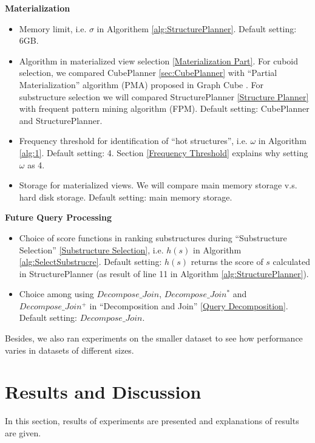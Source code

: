 \textbf{Materialization}
\begin{itemize}
	
	\item  Memory limit, i.e. $\sigma$ in Algorithem \ref{alg:StructurePlanner}. Default setting: 6GB.
	
	\item  Algorithm in materialized view selection \ref{Materialization Part}. For cuboid selection, we  compared CubePlanner \ref{sec:CubePlanner} with ``Partial Materialization'' algorithm (PMA) proposed in Graph Cube \cite{DBLP:conf/sigmod/ZhaoLXH11}. For substructure selection we will compared StructurePlanner \ref{Structure Planner} with frequent pattern mining algorithm (FPM). Default setting: CubePlanner and StructurePlanner.
	
	\item Frequency threshold for identification of “hot structures”, i.e. $\omega$ in Algorithm \ref{alg:1}. Default setting: 4. Section \ref{Frequency Threshold} explains why setting $\omega$ as 4. 
	
	\item Storage for materialized views. We will compare main memory storage v.s. hard disk storage. Default setting: main memory storage.
	
\end{itemize}

\textbf{Future Query Processing}
\begin{itemize}
	\item  Choice of score functions in ranking substructures during ``Substructure Selection'' \ref{Substructure Selection}, i.e. $h(s)$ in Algorithm \ref{alg:SelectSubstrucre}. Default setting: $h(s)$ returns the score of $s$ calculated in StructurePlanner (as result of line 11 in Algorithm \ref{alg:StructurePlanner}). 
	
	\item  Choice among using $Decompose\_Join$, $Decompose\_Join^{*}$ and $Decompose\_Join^{+}$ in ``Decomposition and Join'' \ref{Query Decomposition}. Default setting: $Decompose\_Join$.
	
\end{itemize}

Besides, we also ran experiments on the smaller dataset to see how performance varies in datasets of different sizes.  

\section{Results and Discussion}
\label{Results and Discussion}
In this section, results of experiments are presented and explanations of results are given. 

